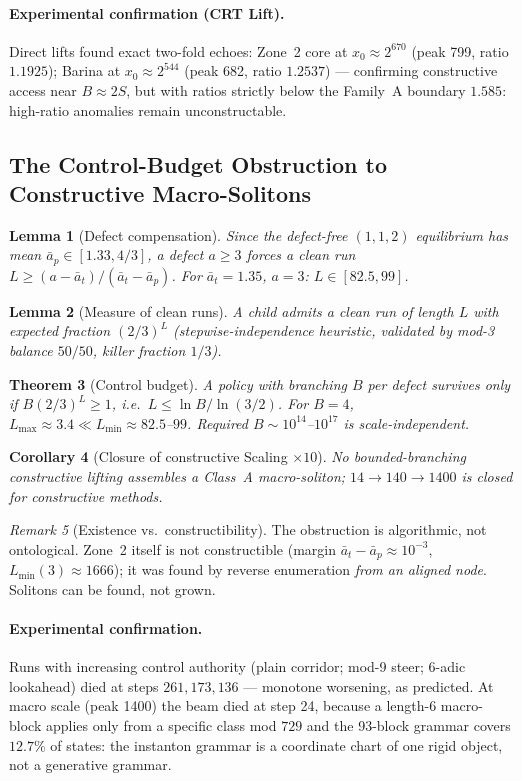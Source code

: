\documentclass[12pt,a4paper]{article}
\newtheorem{theorem}{Theorem}
\newtheorem{lemma}[theorem]{Lemma}
\newtheorem{corollary}[theorem]{Corollary}
\theoremstyle{remark}
\newtheorem{remark}[theorem]{Remark}
\begin{document}
\paragraph{Experimental confirmation (CRT Lift).} Direct lifts found exact two-fold echoes: Zone~2 core at $x_0\approx2^{670}$ (peak 799, ratio $1.1925$); Barina at $x_0\approx2^{544}$ (peak 682, ratio $1.2537$) --- confirming constructive access near $B\approx2S$, but with ratios strictly below the Family~A boundary $1.585$: high-ratio anomalies remain unconstructable.

\subsection{The Control-Budget Obstruction to Constructive Macro-Solitons}
\begin{lemma}[Defect compensation]
Since the defect-free $(1,1,2)$ equilibrium has mean $\bar a_p\in[1.33,4/3]$, a defect $a\ge3$ forces a clean run $L\ge(a-\bar a_t)/(\bar a_t-\bar a_p)$. For $\bar a_t=1.35$, $a=3$: $L\in[82.5,99]$.
\end{lemma}
\begin{lemma}[Measure of clean runs]
A child admits a clean run of length $L$ with expected fraction $(2/3)^L$ (stepwise-independence heuristic, validated by mod-3 balance $50/50$, killer fraction $1/3$).
\end{lemma}
\begin{theorem}[Control budget]
A policy with branching $B$ per defect survives only if $B(2/3)^L\ge1$, i.e.\ $L\le\ln B/\ln(3/2)$. For $B=4$, $L_{\max}\approx3.4\ll L_{\min}\approx82.5$--$99$. Required $B\sim10^{14}$--$10^{17}$ is scale-independent.
\end{theorem}
\begin{corollary}[Closure of constructive Scaling $\times10$]
No bounded-branching constructive lifting assembles a Class~A macro-soliton; $14\to140\to1400$ is closed for constructive methods.
\end{corollary}
\begin{remark}[Existence vs.\ constructibility]
The obstruction is algorithmic, not ontological. Zone~2 itself is not constructible (margin $\bar a_t-\bar a_p\approx10^{-3}$, $L_{\min}(3)\approx1666$); it was found by reverse enumeration \emph{from an aligned node}. Solitons can be found, not grown.
\end{remark}
\paragraph{Experimental confirmation.} Runs with increasing control authority (plain corridor; mod-9 steer; 6-adic lookahead) died at steps $261,173,136$ --- monotone worsening, as predicted. At macro scale (peak 1400) the beam died at step 24, because a length-6 macro-block applies only from a specific class mod $729$ and the 93-block grammar covers $12.7\%$ of states: the instanton grammar is a coordinate chart of one rigid object, not a generative grammar.
\end{document}
